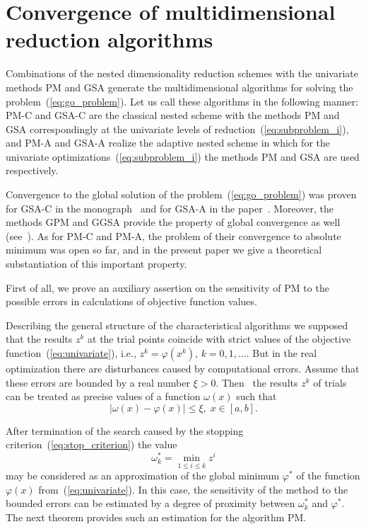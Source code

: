 \documentclass[preprint]{elsarticle}
\begin{document}
\section{Convergence of multidimensional reduction algorithms}
\label{sec:convergence}
Combinations of the nested dimensionality reduction schemes with the univariate methods PM and GSA generate the multidimensional algorithms for solving the problem~(\ref{eq:go_problem}). Let us call these algorithms in the following manner: PM-C and GSA-C are the classical nested scheme with the methods PM and GSA correspondingly at the univariate levels of reduction~(\ref{eq:subproblem_i}), and PM-A and GSA-A realize the adaptive nested scheme in which for the univariate optimizations~(\ref{eq:subproblem_i}) the methods PM and GSA are used respectively.

Convergence to the global solution of the problem~(\ref{eq:go_problem}) was proven for GSA-C in the monograph~\cite{bib51} and for GSA-A in the paper~\cite{bib38}. Moreover, the methods GPM and GGSA provide the property of global convergence as well (see~\cite{bib29,bib51}). As for PM-C and PM-A, the problem of their convergence to absolute minimum was open so far, and in the present paper we give a theoretical substantiation of this important property.

First of all, we prove an auxiliary assertion on the sensitivity of PM to the possible errors in calculations of objective function values.

Describing the general structure of the characteristical algorithms we supposed that the results $z^k$ at the trial points coincide with strict values of the objective function~(\ref{eq:univariate}), i.e., $z^k = \varphi(x^k)$, $k = 0, 1, \dots$. But in the real optimization there are disturbances caused by computational errors. Assume that these errors are bounded by a real number $\xi > 0$. Then~\cite{bib51} the results $z^k$ of trials can be treated as precise values of a function $\omega(x)$ such that
\begin{equation}
  \label{eq:convergence_cond}
  | \omega(x) - \varphi(x) | \leq \xi, \; x \in [a, b].
\end{equation}

After termination of the search caused by the stopping criterion~(\ref{eq:stop_criterion}) the value
\begin{equation}
  \omega_k^* = \min_{1 \leq i \leq k} z^i
\end{equation}
%
may be considered as an approximation of the global minimum $\varphi^*$ of the function $\varphi(x)$ from~(\ref{eq:univariate}). In this case,
the sensitivity of the method to the bounded errors can be estimated by a degree of proximity between $\omega_k^*$ and $\varphi^*$. The next theorem provides such an estimation for the algorithm PM.
\end{document}

